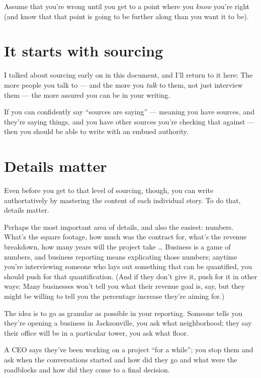 \documentclass[
  11pt,
  american,
  letterpaperpaper,
  extrafontsizes,onecolumn,openright
  ]{memoir}
\begin{document}
Assume that you're wrong until you get to a point where you \emph{know} you're right (and know that that point is going to be further along than you want it to be).

\hypertarget{it-starts-with-sourcing}{%
\section*{It starts with sourcing}\label{it-starts-with-sourcing}}

I talked about sourcing early on in this document, and I'll return to it here: The more people you talk to --- and the more you \emph{talk} to them, not just interview them --- the more assured you can be in your writing.

If you can confidently say \enquote{sources are saying} --- meaning you have sources, and they're saying things, and you have other sources you're checking that against --- then you should be able to write with an embued authority.

\hypertarget{details-matter}{%
\section*{Details matter}\label{details-matter}}

Even before you get to that level of sourcing, though, you can write authortatively by mastering the content of each individual story. To do that, details matter.

Perhaps the most important area of details, and also the easiest: numbers. What's the square footage, how much was the contract for, what's the revenue breakdown, how many years will the project take \ldots{} Business is a game of numbers, and business reporting means explicating those numbers; anytime you're interviewing someone who lays out something that can be quantified, you should push for that quantification. (And if they don't give it, push for it in other ways: Many businesses won't tell you what their revenue goal is, say, but they might be willing to tell you the percentage increase they're aiming for.)

The idea is to go as granular as possible in your reporting. Someone tells you they're opening a business in Jacksonville, you ask what neighborhood; they say their office will be in a particular tower, you ask what floor.

A CEO says they've been working on a project \enquote{for a while}; you stop them and ask when the conversations started and how did they go and what were the roadblocks and how did they come to a final decision.
\end{document}

